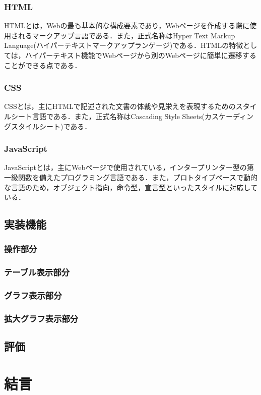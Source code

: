 \documentclass[a4paper, 12pt]{ltjsarticle}
\begin{document}
\subsubsection{HTML}
HTMLとは，Webの最も基本的な構成要素であり，Webページを作成する際に使用されるマークアップ言語である．また，正式名称はHyper Text Markup Language(ハイパーテキストマークアップランゲージ)である．HTMLの特徴としては，ハイパーテキスト機能でWebページから別のWebページに簡単に遷移することができる点である．
\subsubsection{CSS}
CSSとは，主にHTMLで記述された文書の体裁や見栄えを表現するためのスタイルシート言語である．また，正式名称はCascading Style Sheets(カスケーディングスタイルシート)である．
\subsubsection{JavaScript}
JavaScriptとは，主にWebページで使用されている，インタープリンター型の第一級関数を備えたプログラミング言語である．また，プロトタイプベースで動的な言語のため，オブジェクト指向，命令型，宣言型といったスタイルに対応している．
\clearpage
\subsection{実装機能}
\subsubsection{操作部分}
\subsubsection{テーブル表示部分}
\subsubsection{グラフ表示部分}
\subsubsection{拡大グラフ表示部分}
\subsection{評価}
\clearpage
\section{結言}
\clearpage

\end{document}
